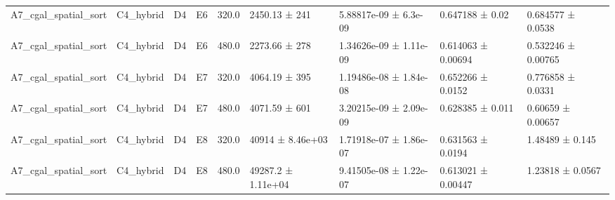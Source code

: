 \begin{table}
\begin{tabular}{lllllllll}
A7\_cgal\_spatial\_sort & C4\_hybrid & D4 & E6 & 320.0 & 2450.13 ± 241 & 5.88817e-09 ± 6.3e-09 & 0.647188 ± 0.02 & 0.684577 ± 0.0538 \\
A7\_cgal\_spatial\_sort & C4\_hybrid & D4 & E6 & 480.0 & 2273.66 ± 278 & 1.34626e-09 ± 1.11e-09 & 0.614063 ± 0.00694 & 0.532246 ± 0.00765 \\
A7\_cgal\_spatial\_sort & C4\_hybrid & D4 & E7 & 320.0 & 4064.19 ± 395 & 1.19486e-08 ± 1.84e-08 & 0.652266 ± 0.0152 & 0.776858 ± 0.0331 \\
A7\_cgal\_spatial\_sort & C4\_hybrid & D4 & E7 & 480.0 & 4071.59 ± 601 & 3.20215e-09 ± 2.09e-09 & 0.628385 ± 0.011 & 0.60659 ± 0.00657 \\
A7\_cgal\_spatial\_sort & C4\_hybrid & D4 & E8 & 320.0 & 40914 ± 8.46e+03 & 1.71918e-07 ± 1.86e-07 & 0.631563 ± 0.0194 & 1.48489 ± 0.145 \\
A7\_cgal\_spatial\_sort & C4\_hybrid & D4 & E8 & 480.0 & 49287.2 ± 1.11e+04 & 9.41505e-08 ± 1.22e-07 & 0.613021 ± 0.00447 & 1.23818 ± 0.0567 \\
\bottomrule
\end{tabular}
\end{table}
